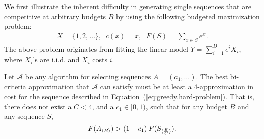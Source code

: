 We first illustrate the inherent difficulty in 
generating single sequences that are competitive at arbitrary budgets
$B$ by using the following budgeted maximization problem:
\begin{align}
\label{eq:greedy.hard-problem}
X = \{1,2,\ldots\},\;\; c(x) = x, \;\;
F(S) = \sum_{x \in S} e^x.
\end{align}
The above problem originates from fitting the linear model
$Y = \sum _{i=1}^D e^iX_i$, where $X_i$'s are i.i.d. and $X_i$ 
costs $i$. 

\begin{theorem}
\label{thm:greedy.biapproximation-upper-bound}
Let $\mathcal{A}$ be any algorithm for selecting sequences $A = (a_1,
\ldots)$.  The best bi-criteria approximation that $\mathcal{A}$ can
satisfy must be at least a $4$-approximation in cost for the sequence
described in Equation~(\ref{eq:greedy.hard-problem}).  That is, there
does not exist a $C < 4$, and a $c_1 \in [0,1)$, such that for any budget $B$ and
any sequence $S$,
\[
F(A_{\langle B \rangle}) > \left(1 - c_1\right) F(S_{\langle \frac{B}{C} \rangle}).
\]
\end{theorem}

